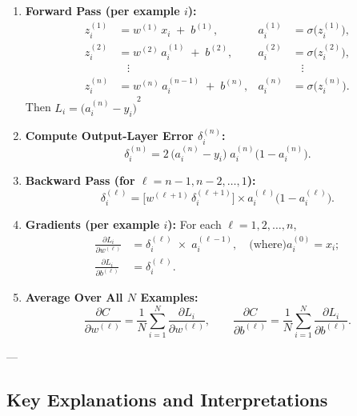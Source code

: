 \documentclass{article}
\begin{document}
\begin{enumerate}
    \item \textbf{Forward Pass (per example \(i\)):}  
      \[
      \begin{aligned}
        z_i^{(1)} &= w^{(1)}\,x_i \;+\; b^{(1)}, 
        &a_i^{(1)} &= \sigma\bigl(z_i^{(1)}\bigr),\\
        z_i^{(2)} &= w^{(2)}\,a_i^{(1)} \;+\; b^{(2)}, 
        &a_i^{(2)} &= \sigma\bigl(z_i^{(2)}\bigr),\\
        &\;\;\;\vdots &&\;\;\;\vdots\\
        z_i^{(n)} &= w^{(n)}\,a_i^{(n-1)} \;+\; b^{(n)}, 
        &a_i^{(n)} &= \sigma\bigl(z_i^{(n)}\bigr).
      \end{aligned}
      \]
      Then \(L_i = {\bigl(a_i^{(n)} - y_i\bigr)}^2\)

    \item \textbf{Compute Output-Layer Error \(\delta_i^{(n)}\):}  
      \[
        \delta_i^{(n)} 
        = 2\,\bigl(a_i^{(n)} - y_i\bigr)\;a_i^{(n)}\bigl(1 - a_i^{(n)}\bigr).
      \]

    \item \textbf{Backward Pass (for \(\ell = n-1,n-2,\dots,1\)):}  
      \[
        \delta_i^{(\ell)} 
        = \bigl[w^{(\ell+1)}\,\delta_i^{(\ell+1)}\bigr] 
          \times a_i^{(\ell)}\bigl(1 - a_i^{(\ell)}\bigr).
      \]

    \item \textbf{Gradients (per example \(i\)):}  
      For each \(\ell = 1,2,\dots,n\),
      \begin{align*}
        \frac{\partial L_i}{\partial w^{(\ell)}} 
        &= \delta_i^{(\ell)} \;\times\; a_i^{(\ell-1)}, 
        \quad 
          \text{(where)}a_i^{(0)} = x_i\text{}; \\
        \frac{\partial L_i}{\partial b^{(\ell)}} 
        &= \delta_i^{(\ell)}.
      \end{align*}

    \item \textbf{Average Over All \(N\) Examples:}  
      \[
        \frac{\partial C}{\partial w^{(\ell)}} 
        = \frac{1}{N}\sum_{i=1}^N \frac{\partial L_i}{\partial w^{(\ell)}}, 
        \qquad
        \frac{\partial C}{\partial b^{(\ell)}} 
        = \frac{1}{N}\sum_{i=1}^N \frac{\partial L_i}{\partial b^{(\ell)}}.
      \]
\end{enumerate}

---

\subsection{Key Explanations and Interpretations}\label{sec:nlayers-explanations}
\end{document}
